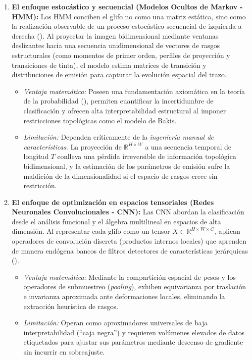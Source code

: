 \documentclass[
  spanish,
  us-letterpaper,
]{scrreprt}
\providecommand{\tightlist}{%
  \setlength{\itemsep}{0pt}\setlength{\parskip}{0pt}}
\theoremstyle{definition}
\theoremstyle{remark}
\begin{document}
\begin{enumerate}
\def\labelenumi{\arabic{enumi}.}
\tightlist
\item
  \textbf{El enfoque estocástico y secuencial (Modelos Ocultos de Markov
  - HMM):} Los HMM conciben el glifo no como una matriz estática, sino
  como la realización observable de un proceso estocástico secuencial de
  izquierda a derecha (). Al
  proyectar la imagen bidimensional mediante ventanas deslizantes hacia
  una secuencia unidimensional de vectores de rasgos estructurales (como
  momentos de primer orden, perfiles de proyección y transiciones de
  tinta), el modelo estima matrices de transición y distribuciones de
  emisión para capturar la evolución espacial del trazo.

  \begin{itemize}
  \tightlist
  \item
    \emph{Ventaja matemática:} Poseen una fundamentación axiomática en
    la teoría de la probabilidad (), permiten cuantificar la incertidumbre de clasificación y
    ofrecen alta interpretabilidad estructural al imponer restricciones
    topológicas como el modelo de Bakis.
  \item
    \emph{Limitación:} Dependen críticamente de la \emph{ingeniería
    manual de características}. La proyección de
    \(\mathbb{R}^{H \times W}\) a una secuencia temporal de longitud
    \(T\) conlleva una pérdida irreversible de información topológica
    bidimensional, y la estimación de los parámetros de emisión sufre la
    maldición de la dimensionalidad si el espacio de rasgos crece sin
    restricción.
  \end{itemize}
\item
  \textbf{El enfoque de optimización en espacios tensoriales (Redes
  Neuronales Convolucionales - CNN):} Las CNN abordan la clasificación
  desde el análisis funcional y el álgebra multilineal en espacios de
  alta dimensión. Al representar cada glifo como un tensor
  \(X \in \mathbb{R}^{H \times W \times C}\), aplican operadores de
  convolución discreta (productos internos locales) que aprenden de
  manera endógena bancos de filtros detectores de características
  jerárquicas ().

  \begin{itemize}
  \tightlist
  \item
    \emph{Ventaja matemática:} Mediante la compartición espacial de
    pesos y los operadores de submuestreo (\emph{pooling}), exhiben
    equivarianza por traslación e invarianza aproximada ante
    deformaciones locales, eliminando la extracción heurística de
    rasgos.
  \item
    \emph{Limitación:} Operan como aproximadores universales de baja
    interpretabilidad (``caja negra'') y requieren volúmenes elevados de
    datos etiquetados para ajustar sus parámetros mediante descenso de
    gradiente sin incurrir en sobreajuste.
  \end{itemize}
\end{enumerate}
\end{document}

